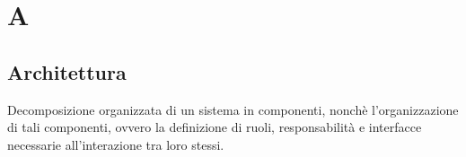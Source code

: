 \section*{A}

\subsection{Architettura}
Decomposizione organizzata di un sistema in componenti, nonchè l'organizzazione di tali componenti, ovvero la definizione di ruoli, responsabilità e interfacce necessarie all'interazione tra loro stessi.